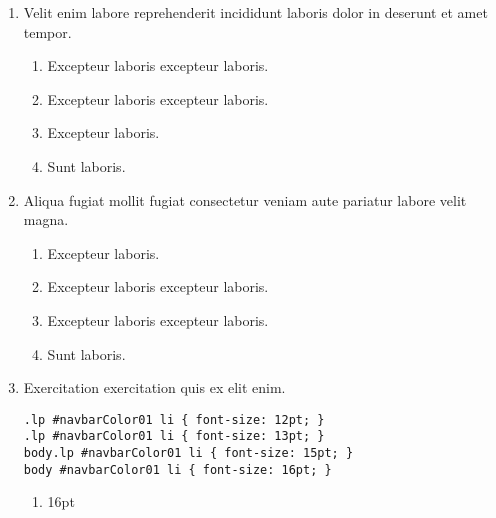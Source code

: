 \documentclass[a4paper,12pt]{article}
\begin{document}
\begin{enumerate}[label=\textbf{\arabic*.}]
\begin{multicols}{2}
\begin{enumerate}
	\end{enumerate}

\end{multicols}
\item Velit enim labore reprehenderit incididunt laboris dolor in deserunt et amet tempor.
\begin{multicols}{2}
	\begin{enumerate}
		\item  Excepteur laboris excepteur laboris.
    
		\item  Excepteur laboris excepteur laboris.
  
		\item  Excepteur laboris.
    
		\item  Sunt laboris.
    
	\end{enumerate}

\end{multicols}
\item Aliqua fugiat mollit fugiat consectetur veniam aute pariatur labore velit magna.
\begin{multicols}{2}
	\begin{enumerate}
		\item  Excepteur laboris.
    
		\item  Excepteur laboris excepteur laboris.
    
		\item  Excepteur laboris excepteur laboris.
  
		\item  Sunt laboris.
    
	\end{enumerate}

\end{multicols}
\item Exercitation exercitation quis ex elit enim.
  
  \begin{minipage}{\textwidth} %
  \begin{lstlisting}
.lp #navbarColor01 li { font-size: 12pt; }
.lp #navbarColor01 li { font-size: 13pt; }
body.lp #navbarColor01 li { font-size: 15pt; }
body #navbarColor01 li { font-size: 16pt; }
  \end{lstlisting}
  \end{minipage}
\begin{multicols}{2}
	\begin{enumerate}
		\item  16pt
  

\end{enumerate}
\end{multicols}
\end{enumerate}
\end{document}

